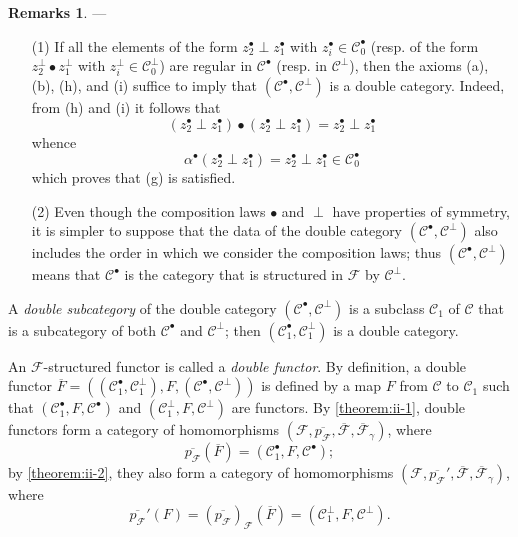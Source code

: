\documentclass[a4paper,fleqn]{article}
\theoremstyle{plain}
\theoremstyle{definition}
\newtheorem*{remarks}{Remarks}
\newcommand{\oldpage}[1]{{\marginpar{\footnotesize$\bigg\vert$\,\,\,\,\textit{p.~#1}}}}
\newcommand{\CC}{\mathcal{C}}
\newcommand{\FF}{\mathcal{F}}
\begin{document}
\begin{remarks}
  ---
  \begin{enumerate}
    \item[\normalfont(1)]
      If all the elements of the form $z_2^\bullet\perp z_1^\bullet$ with $z_i^\bullet\in\CC_0^\bullet$ (resp. of the form $z_2^\perp\bullet z_1^\perp$ with $z_i^\perp\in\CC_0^\perp$) are regular \cite{3a} in $\CC^\bullet$ (resp. in $\CC^\perp$), then the axioms (a), (b), (h), and (i) suffice to imply that $(\CC^\bullet,\CC^\perp)$ is a double category.
      Indeed, from (h) and (i) it follows that
      \[
        (z_2^\bullet\perp z_1^\bullet)\bullet(z_2^\bullet\perp z_1^\bullet)
        = z_2^\bullet\perp z_1^\bullet
      \]
      whence
      \[
        \alpha^\bullet(z_2^\bullet\perp z_1^\bullet)
        = z_2^\bullet\perp z_1^\bullet
        \in\CC_0^\bullet
      \]
      which proves that (g) is satisfied.

    \item[\normalfont(2)]
      \oldpage{65}
      Even though the composition laws $\bullet$ and $\perp$ have properties of symmetry, it is simpler to suppose that the data of the double category $(\CC^\bullet,\CC^\perp)$ also includes the order in which we consider the composition laws;
      thus $(\CC^\bullet,\CC^\perp)$ means that $\CC^\bullet$ is the category that is structured in $\FF$ by $\CC^\perp$.
  \end{enumerate}
\end{remarks}

A \emph{double subcategory} of the double category $(\CC^\bullet,\CC^\perp)$ is a subclass $\CC_1$ of $\CC$ that is a subcategory of both $\CC^\bullet$ and $\CC^\perp$;
then $(\CC_1^\bullet,\CC_1^\perp)$ is a double category.

An $\FF$-structured functor is called a \emph{double functor}.
By definition, a double functor $\overline{F}=((\CC_1^\bullet,\CC_1^\perp),F,(\CC^\bullet,\CC^\perp))$ is defined by a map $F$ from $\CC$ to $\CC_1$ such that $(\CC_1^\bullet,F,\CC^\bullet)$ and $(\CC_1^\perp,F,\CC^\perp)$ are functors.
By \cref{theorem:ii-1}, double functors form a category of homomorphisms $(\FF,\overline{p_\FF},\overline{\FF},\overline{\FF}_\gamma)$, where
\[
  \overline{p_\FF}(\overline{F})
  = (\CC_1^\bullet,F,\CC^\bullet);
\]
by \cref{theorem:ii-2}, they also form a category of homomorphisms $(\FF,\overline{p_\FF}',\overline{\FF},\overline{\FF}_\gamma)$, where
\[
  \overline{p_\FF}'(F)
  = (\overline{p_\FF})_\FF(\overline{F})
  = (\CC_1^\perp,F,\CC^\perp).
\]
\end{document}
